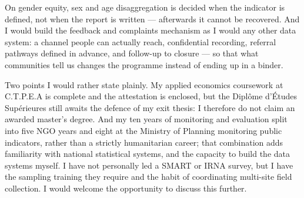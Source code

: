 \documentclass[10pt,a4paper,sans]{moderncv}
\begin{document}
On gender equity, sex and age disaggregation is decided when the indicator is defined, not when the report is written --- afterwards it cannot be recovered. And I would build the feedback and complaints mechanism as I would any other data system: a channel people can actually reach, confidential recording, referral pathways defined in advance, and follow-up to closure --- so that what communities tell us changes the programme instead of ending up in a binder.

Two points I would rather state plainly. My applied economics coursework at C.T.P.E.A is complete and the attestation is enclosed, but the Diplôme d'Études Supérieures still awaits the defence of my exit thesis: I therefore do not claim an awarded master's degree. And my ten years of monitoring and evaluation split into five NGO years and eight at the Ministry of Planning monitoring public indicators, rather than a strictly humanitarian career; that combination adds familiarity with national statistical systems, and the capacity to build the data systems myself. I have not personally led a SMART or IRNA survey, but I have the sampling training they require and the habit of coordinating multi-site field collection. I would welcome the opportunity to discuss this further.

\makeletterclosing
\end{document}
